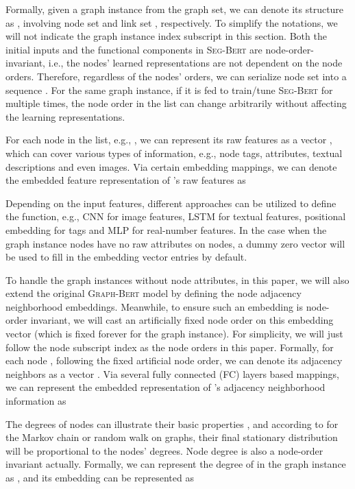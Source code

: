 \documentclass{article}
\newcommand{\our}{\textsc{Seg-Bert}}
\newcommand{\gbert}{\textsc{Graph-Bert}}
\begin{document}
Formally, given a graph instance  from the graph set, we can denote its structure as , involving node set  and link set , respectively. To simplify the notations, we will not indicate the graph instance index subscript in this section. Both the initial inputs and the functional components in {\our} are node-order-invariant, i.e., the nodes' learned representations are not dependent on the node orders. Therefore, regardless of the nodes' orders, we can serialize node set  into a sequence . For the same graph instance, if it is fed to train/tune {\our} for multiple times, the node order in the list can change arbitrarily without affecting the learning representations.

For each node in the list, e.g., , we can represent its raw features as a vector , which can cover various types of information, e.g., node tags, attributes, textual descriptions and even images. Via certain embedding mappings, we can denote the embedded feature representation of 's raw features as

Depending on the input features, different approaches can be utilized to define the  function, e.g., CNN for image features, LSTM for textual features, positional embedding for tags and MLP for real-number features. In the case when the graph instance nodes have no raw attributes on nodes, a dummy zero vector will be used to fill in the embedding vector  entries by default.

To handle the graph instances without node attributes, in this paper, we will also extend the original {\gbert} model by defining the node adjacency neighborhood embeddings. Meanwhile, to ensure such an embedding is node-order invariant, we will cast an artificially fixed node order on this embedding vector (which is fixed forever for the graph instance). For simplicity, we will just follow the node subscript index as the node orders in this paper. Formally, for each node , following the fixed artificial node order, we can denote its adjacency neighbors as a vector . Via several fully connected (FC) layers based mappings, we can represent the embedded representation of 's adjacency neighborhood information as 


The degrees of nodes can illustrate their basic properties \cite{Chung_Spectra_03,Bondy_Graph_76}, and according to \cite{Lovasz1996} for the Markov chain or random walk on graphs, their final stationary distribution will be proportional to the nodes' degrees. Node degree is also a node-order invariant actually. Formally, we can represent the degree of  in the graph instance as , and its embedding can be represented as 
\end{document}

